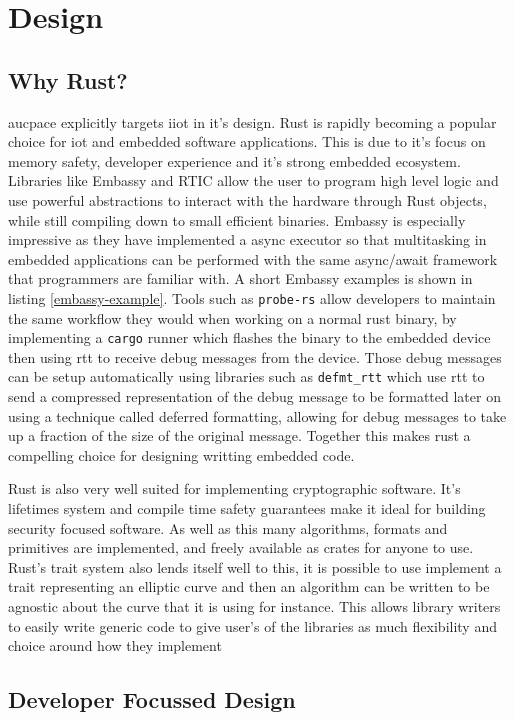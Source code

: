 \chapter{Design}

\section{Why Rust?}
\label{sec:why-rust}

\gls{aucpace} explicitly targets \gls{iiot} in it's design.
Rust is rapidly becoming a popular choice for \gls{iot} and embedded software applications.
This is due to it's focus on memory safety, developer experience and it's strong embedded ecosystem.
Libraries like Embassy and RTIC allow the user to program high level logic and use powerful abstractions to interact with the hardware through Rust objects, while still compiling down to small efficient binaries.
Embassy is especially impressive as they have implemented a async executor so that multitasking in embedded applications can be performed with the same async/await framework that programmers are familiar with.
A short Embassy examples is shown in listing \ref{embassy-example}.
Tools such as \texttt{probe-rs} allow developers to maintain the same workflow they would when working on a normal rust binary, by implementing a \texttt{cargo} runner which flashes the binary to the embedded device then using \gls{rtt} to receive debug messages from the device.
Those debug messages can be setup automatically using libraries such as \texttt{defmt\_rtt} which use \gls{rtt} to send a compressed representation of the debug message to be formatted later on using a technique called deferred formatting, allowing for debug messages to take up a fraction of the size of the original message.
Together this makes rust a compelling choice for designing writting embedded code.


Rust is also very well suited for implementing cryptographic software.
It's lifetimes system and compile time safety guarantees make it ideal for building security focused software.
As well as this many algorithms, formats and primitives are implemented, and freely available as crates for anyone to use.
Rust's trait system also lends itself well to this, it is possible to use implement a trait representing an elliptic curve and then an algorithm can be written to be agnostic about the curve that it is using for instance.
This allows library writers to easily write generic code to give user's of the libraries as much flexibility and choice around how they implement


\section{Developer Focussed Design}

